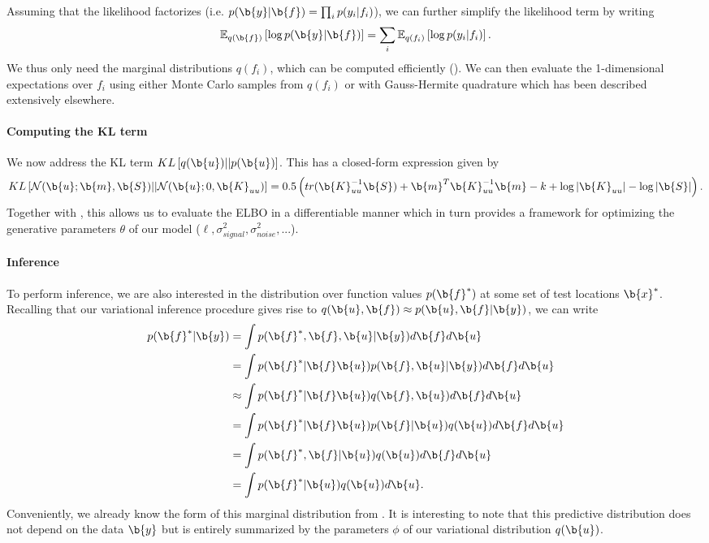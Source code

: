 Assuming that the likelihood factorizes (i.e. $p(\b{y}|\b{f}) = \prod_i p(y_i|f_i)$), we can further simplify the likelihood term by writing
\begin{equation}
    \label{eq:lik_fact}
    \mathbb{E}_{q(\b{f})} \left [ \log p(\b{y} | \b{f}) \right ] = \sum_{i} \mathbb{E}_{q(f_i)} \left [ \log p(y_i | f_i) \right ].
\end{equation}
We thus only need the marginal distributions $q(f_i)$, which can be computed efficiently ().
We can then evaluate the 1-dimensional expectations over $f_i$ using either Monte Carlo samples from $q(f_i)$ or with Gauss-Hermite quadrature which has been described extensively elsewhere.

\paragraph*{Computing the KL term}

We now address the KL term $KL \left [ q(\b{u}) || p(\b{u}) \right ]$.
This has a closed-form expression given by
\begin{equation}
    KL \left [ \mathcal{N}(\b{u}; \b{m}, \b{S} ) || \mathcal{N}(\b{u}; 0, \b{K}_{uu}) \right ]
    = 0.5 \left ( tr(\b{K}_{uu}^{-1} \b{S})
    + \b{m}^T \b{K}_{uu}^{-1} \b{m} - k + \log |\b{K}_{uu}| - \log |\b{S}|
     \right ).
\end{equation}
Together with , this allows us to evaluate the ELBO in a differentiable manner which in turn provides a framework for optimizing the generative parameters $\theta$ of our model ($\ell, \sigma_{signal}^2, \sigma_{noise}^2, ...$).

\paragraph*{Inference}

To perform inference, we are also interested in the distribution over function values $p(\b{f}^*)$ at some set of test locations $\b{x}^*$.
Recalling that our variational inference procedure gives rise to $q(\b{u}, \b{f}) \approx p(\b{u}, \b{f} | \b{y})$, we can write
\begin{align}
    p(\b{f}^* | \b{y}) &= \int p(\b{f}^*, \b{f}, \b{u} | \b{y}) d\b{f} d\b{u}\\
    &= \int p(\b{f}^* | \b{f} \b{u}) p(\b{f}, \b{u} | \b{y})  d\b{f} d\b{u}\\
    &\approx \int p(\b{f}^* | \b{f} \b{u}) q(\b{f}, \b{u}) d\b{f} d\b{u}\\
    &= \int p(\b{f}^* | \b{f} \b{u}) p(\b{f} | \b{u}) q(\b{u})  d\b{f} d\b{u}\\
    &= \int p(\b{f}^*, \b{f} | \b{u}) q(\b{u})  d\b{f} d\b{u}\\
    &= \int p(\b{f}^* | \b{u}) q(\b{u}) d\b{u}.
    \label{eq:pred_pf}
\end{align}
Conveniently, we already know the form of this marginal distribution from .
It is interesting to note that this predictive distribution does not depend on the data $\b{y}$ but is entirely summarized by the parameters $\phi$ of our variational distribution $q(\b{u})$.

